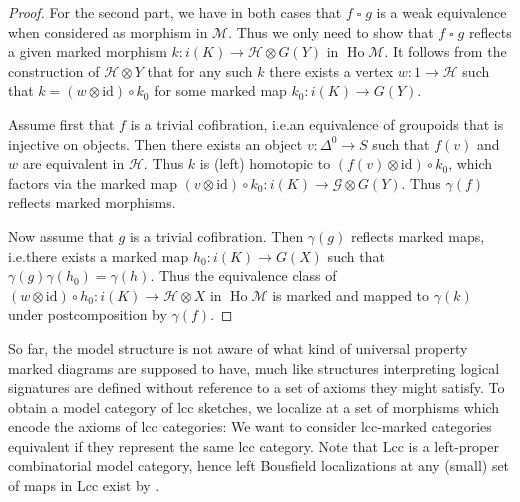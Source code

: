 \documentclass[a4paper]{article}
\theoremstyle{remark}
\theoremstyle{definition}
\begin{document}
\begin{proof}
  For the second part, we have in both cases that $f \mathbin{\square} g$ is a weak equivalence when considered as morphism in $\mathcal{M}$.
  Thus we only need to show that $f \mathbin{\square} g$ reflects a given marked morphism $k : i(K) \rightarrow \mathcal{H} \otimes G(Y)$ in $\operatorname{Ho} \mathcal{M}$.
  It follows from the construction of $\mathcal{H} \otimes Y$ that for any such $k$ there exists a vertex $w : 1 \rightarrow \mathcal{H}$ such that $k = (w \otimes \mathrm{id}) \circ k_0$ for some marked map $k_0 : i(K) \rightarrow G(Y)$.

  Assume first that $f$ is a trivial cofibration, i.e.\@ an equivalence of groupoids that is injective on objects.
  Then there exists an object $v : \Delta^0 \rightarrow S$ such that $f(v)$ and $w$ are equivalent in $\mathcal{H}$.
  Thus $k$ is (left) homotopic to $(f(v) \otimes \mathrm{id}) \circ k_0$, which factors via the marked map $(v \otimes \mathrm{id}) \circ k_0 : i(K) \rightarrow \mathcal{G} \otimes G(Y)$.
  Thus $\gamma(f)$ reflects marked morphisms.

  Now assume that $g$ is a trivial cofibration.
  Then $\gamma(g)$ reflects marked maps, i.e.\@ there exists a marked map $h_0 : i(K) \rightarrow G(X)$ such that $\gamma(g)\gamma(h_0) = \gamma(h)$.
  Thus the equivalence class of $(w \otimes \mathrm{id}) \circ h_0 : i(K) \rightarrow \mathcal{H} \otimes X$ in $\operatorname{Ho} \mathcal{M}$ is marked and mapped to $\gamma(k)$ under postcomposition by $\gamma(f)$.
\end{proof}

So far, the model structure is not aware of what kind of universal property marked diagrams are supposed to have, much like structures interpreting logical signatures are defined without reference to a set of axioms they might satisfy.
To obtain a model category of lcc sketches, we localize at a set of morphisms which encode the axioms of lcc categories:
We want to consider lcc-marked categories equivalent if they represent the same lcc category.
Note that $\mathrm{Lcc}$ is a left-proper combinatorial model category, hence left Bousfield localizations at any (small) set of maps in $\mathrm{Lcc}$ exist by \cite[Theorem 4.1.1]{hirschhorn}.
\end{document}
